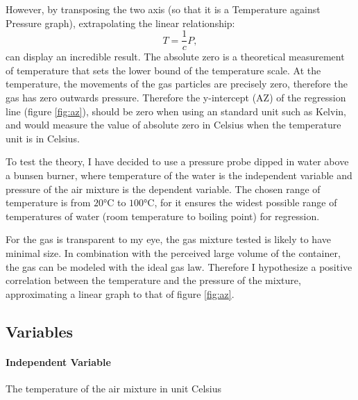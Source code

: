 \documentclass[a4paper,12pt]{article}
\begin{document}
However, by transposing the two axis (so that it is a Temperature against Pressure graph), extrapolating the linear relationship:
\[
    T = \frac{1}{c}P,
\]
can display an incredible result. The absolute zero is a theoretical measurement of temperature that sets the lower bound of the temperature scale. At the temperature, the movements of the gas particles are precisely zero, therefore the gas has zero outwards pressure. Therefore the y-intercept (AZ) of the regression line (figure \ref{fig:az}), should be zero when using an standard unit such as Kelvin, and would measure the value of absolute zero in Celsius when the temperature unit is in Celsius.




To test the theory, I have decided to use a pressure probe dipped in water above a bunsen burner, where temperature of the water is the independent variable and pressure of the air mixture is the dependent variable. The chosen range of temperature is from $20\si{\celsius}$ to $100\si{\celsius}$, for it ensures the widest possible range of temperatures of water (room temperature to boiling point) for regression.

For the gas is transparent to my eye, the gas mixture tested is likely to have minimal size. In combination with the perceived large volume of the container, the gas can be modeled with the ideal gas law. Therefore I hypothesize a positive correlation between the temperature and the pressure of the mixture, approximating a linear graph to that of figure \ref{fig:az}.

\subsection{Variables}
\paragraph{Independent Variable}
The temperature of the air mixture in unit Celsius
\end{document}
